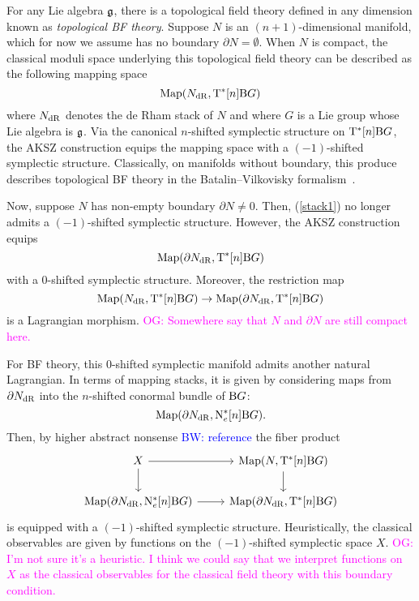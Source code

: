 \documentclass[11pt]{amsart}
\numberwithin{equation}{section}
\def\brian{\textcolor{blue}{BW: }\textcolor{blue}}
\def\owen{\textcolor{magenta}{OG: }\textcolor{magenta}}
\begin{document}
For any Lie algebra $\mathfrak g$, there is a topological field theory defined in any dimension known as {\em topological BF theory}.
Suppose $N$ is an $(n+1)$-dimensional manifold, which for now we assume has no boundary $\partial N = \emptyset$. 
When $N$ is compact, the classical moduli space underlying this topological field theory can be described as the following mapping space 
\begin{equation} \label{stack1}
{\rm Map}(N_{\rm dR} ,  {\rm T}^*[n] {\rm B} G)
\end{equation}
where $N_{\rm dR}$ denotes the de Rham stack of $N$ and where $G$ is a Lie group whose Lie algebra is $\mathfrak g$. 
Via the canonical $n$-shifted symplectic structure on ${\rm T}^* [n] {\rm B} G$, the AKSZ construction equips the mapping space with a $(-1)$-shifted symplectic structure. 
Classically, on manifolds without boundary, this produce describes topological BF theory in the Batalin--Vilkovisky formalism~\cite{BV}. 

Now, suppose $N$ has non-empty boundary $\partial N \ne 0$.
Then, (\ref{stack1}) no longer admits a $(-1)$-shifted symplectic structure. 
However, the AKSZ construction equips 
\[
{\rm Map}(\partial N_{\rm dR} , {\rm T}^* [n] {\rm B} G)
\]
with a $0$-shifted symplectic structure. 
Moreover, the restriction map 
\[
{\rm Map}(N_{\rm dR} , {\rm T}^* [n] {\rm B} G) \to {\rm Map}(\partial N_{\rm dR} , {\rm T}^* [n] {\rm B} G)
\]
is a Lagrangian morphism. 
\owen{Somewhere say that $N$ and $\partial N$ are still compact here.}

For BF theory, this $0$-shifted symplectic manifold admits another natural Lagrangian. 
In terms of mapping stacks, it is given by considering maps from $\partial N_{\rm dR}$ into the $n$-shifted conormal bundle of ${\rm B} G$:
\[
{\rm Map}(\partial N_{\rm dR} , {\rm N}^*_e [n] {\rm B}G) .
\]
Then, by higher abstract nonsense \brian{reference} the fiber product
\[
\begin{tikzcd}
X \ar[r] \ar[d] & {\rm Map} (N , {\rm T}^* [n] {\rm B} G) \ar[d] \\
{\rm Map}(\partial N_{\rm dR} , {\rm N}^*_e  [n] {\rm B}G) \ar[r] & {\rm Map}(\partial N_{\rm dR} , {\rm T}^*[n]  {\rm B}G)
\end{tikzcd}
\]
is equipped with a $(-1)$-shifted symplectic structure. 
Heuristically, the classical observables are given by functions on the $(-1)$-shifted symplectic space $X$.
\owen{I'm not sure it's a heuristic. I think we could say that we interpret functions on $X$ as the classical observables for the classical field theory with this boundary condition.}
\end{document}
